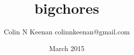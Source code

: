 \documentclass[12pt,letterpaper]{article}
\begin{document}
\title{bigchores{}}
\author{Colin N Keenan colinnkeenan@gmail.com}
\date{March 2015}



\end{document}
